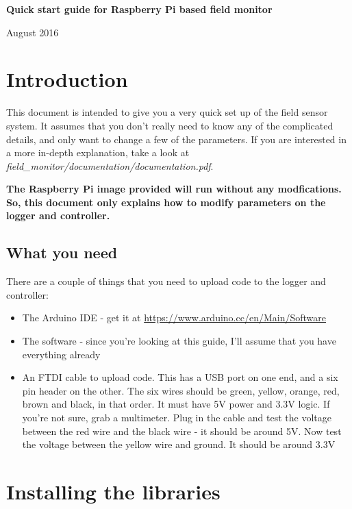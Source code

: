 \documentclass[10pt]{article}
\begin{document}
\begin{center}
\textbf{Quick start guide for Raspberry Pi based field monitor}

August 2016
\end{center}
\newpage

\tableofcontents
\newpage

\section{Introduction}

This document is intended to give you a very quick set up of the field sensor system. It assumes that you don't really need to know any of the complicated details, and only want to change a few of the parameters. If you are interested in a more in-depth explanation, take a look at \textit{field\_monitor/documentation/documentation.pdf}. 

\textbf{The Raspberry Pi image provided will run without any modfications. So, this document only explains how to modify parameters on the logger and controller.}

\subsection{What you need}

There are a couple of things that you need to upload code to the logger and controller:

\begin{itemize}
 \item The Arduino IDE - get it at \url{https://www.arduino.cc/en/Main/Software}
 \item The software - since you're looking at this guide, I'll assume that you have everything already
 \item An FTDI cable to upload code. This has a USB port on one end, and a six pin header on the other. The six wires should be green, yellow, orange, red, brown and black, in that order. It must have 5V power and 3.3V logic. If you're not sure, grab a multimeter. Plug in the cable and test the voltage between the red wire and the black wire - it should be around 5V. Now test the voltage between the yellow wire and ground. It should be around 3.3V
\end{itemize}

\section{Installing the libraries}
\end{document}
